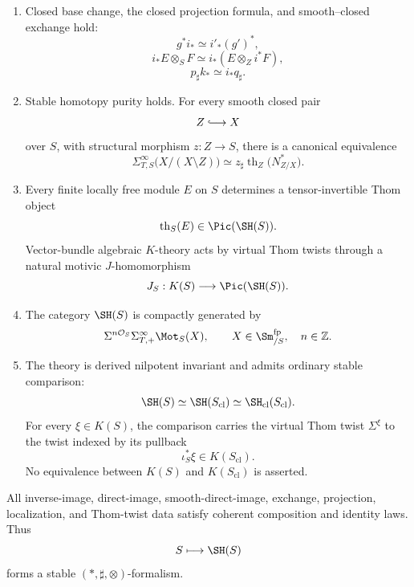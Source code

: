 \begin{theorem}
\begin{enumerate}
    \item Closed base change, the closed projection formula, and smooth--closed exchange hold:
    \[
        g^*i_*
        \simeq
        i'_*(g')^*,
    \]
    \[
        i_*E\otimes_SF
        \simeq
        i_*(E\otimes_Zi^*F),
    \]
    \[
        p_\sharp k_*
        \simeq
        i_*q_\sharp.
    \]

    \item Stable homotopy purity holds.  For every smooth closed pair
    \[
        Z\lhook\joinrel\longrightarrow X
    \]
    over \(S\), with structural morphism \(z:Z\to S\), there is a canonical
    equivalence
    \[
        \Sigma_{T,S}^\infty
        \bigl(
          X/(X\setminus Z)
        \bigr)
        \simeq
        z_\sharp
        \operatorname{th}_Z
        \bigl(
          N^*_{Z/X}
        \bigr).
    \]

    \item Every finite locally free module \(E\) on \(S\) determines a
    tensor-invertible Thom object
    \[
        \operatorname{th}_S(E)
        \in
        \Pic(\SH(S)).
    \]
    Vector-bundle algebraic \(K\)-theory acts by virtual Thom twists through a
    natural motivic \(J\)-homomorphism
    \[
        J_S:
        K(S)
        \longrightarrow
        \Pic(\SH(S)).
    \]

    \item The category $\SH(S)$ is compactly generated by
    \[
        \Sigma^{n\mathcal O_S}
        \Sigma_{T,+}^\infty\Mot_S(X),
        \qquad
        X\in\Sm^{\mathrm{fp}}_{/S},
        \quad n\in\mathbb Z.
    \]

    \item The theory is derived nilpotent invariant and admits ordinary stable
    comparison:
    \[
        \SH(S)
        \simeq
        \SH(S_{\mathrm{cl}})
        \simeq
        \SH_{\mathrm{cl}}(S_{\mathrm{cl}}).
    \]
    For every \(\xi\in K(S)\), the comparison carries the virtual Thom twist
    \(\Sigma^\xi\) to the twist indexed by its pullback
    \[
        \iota_S^*\xi
        \in
        K(S_{\mathrm{cl}}).
    \]
    No equivalence between \(K(S)\) and \(K(S_{\mathrm{cl}})\) is asserted.
\end{enumerate}

All inverse-image, direct-image, smooth-direct-image, exchange, projection, localization, and
Thom-twist data satisfy coherent composition and identity laws.  Thus
\[
    S\longmapsto\SH(S)
\]
forms a stable $(\ast,\sharp,\otimes)$-formalism.
\end{theorem}

